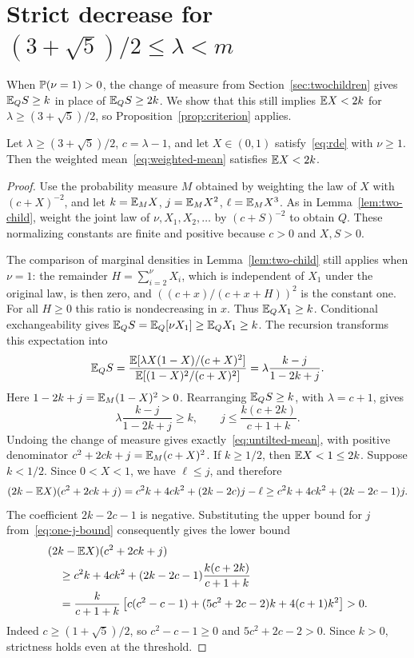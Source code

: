 \section{Strict decrease for \texorpdfstring{$(3+\sqrt5)/2\le\lambda<m$}{(3+sqrt(5))/2 <= lambda < m}}\label{sec:high}

When $\mathbb P(\nu=1)>0$, the change of measure from Section~\ref{sec:twochildren} gives $\mathbb E_QS\ge k$ in place of $\mathbb E_QS\ge2k$. We show that this still implies $\mathbb E X<2k$ for $\lambda\ge(3+\sqrt5)/2$, so Proposition~\ref{prop:criterion} applies.

\begin{lemma}\label{lem:one-child}
Let $\lambda\ge(3+\sqrt5)/2$, $c=\lambda-1$, and let $X\in(0,1)$ satisfy~\eqref{eq:rde} with $\nu\ge1$. Then the weighted mean~\eqref{eq:weighted-mean} satisfies $\mathbb E X<2k$.
\end{lemma}

\begin{proof}
Use the probability measure $M$ obtained by weighting the law of $X$ with $(c+X)^{-2}$, and let $k=\mathbb E_M X$, $j=\mathbb E_M X^2$, $\ell=\mathbb E_M X^3$. As in Lemma~\ref{lem:two-child}, weight the joint law of $\nu,X_1,X_2,\ldots$ by $(c+S)^{-2}$ to obtain $Q$. These normalizing constants are finite and positive because $c>0$ and $X,S>0$.

The comparison of marginal densities in Lemma~\ref{lem:two-child} still applies when $\nu=1$: the remainder $H=\sum_{i=2}^{\nu}X_i$, which is independent of $X_1$ under the original law, is then zero, and $((c+x)/(c+x+H))^2$ is the constant one. For all $H\ge0$ this ratio is nondecreasing in $x$. Thus $\mathbb E_QX_1\ge k$. Conditional exchangeability gives $\mathbb E_QS=\mathbb E_Q[\nu X_1]\ge\mathbb E_QX_1\ge k$. The recursion transforms this expectation into
\[
 \mathbb E_QS=\frac{\mathbb E[\lambda X(1-X)/(c+X)^2]}
 {\mathbb E[(1-X)^2/(c+X)^2]}
 =\lambda\frac{k-j}{1-2k+j}.
\]
Here $1-2k+j=\mathbb E_M(1-X)^2>0$. Rearranging $\mathbb E_QS\ge k$, with $\lambda=c+1$, gives
\begin{equation}\label{eq:one-j-bound}
 \lambda\frac{k-j}{1-2k+j}\ge k,
 \qquad j\le\frac{k(c+2k)}{c+1+k}.
\end{equation}
Undoing the change of measure gives exactly~\eqref{eq:untilted-mean}, with positive denominator $c^2+2ck+j=\mathbb E_M(c+X)^2$. If $k\ge1/2$, then $\mathbb E X<1\le2k$. Suppose $k<1/2$. Since $0<X<1$, we have $\ell\le j$, and therefore
\[
 (2k-\mathbb E X)(c^2+2ck+j)
 =c^2k+4ck^2+(2k-2c)j-\ell
 \ge c^2k+4ck^2+(2k-2c-1)j.
\]
The coefficient $2k-2c-1$ is negative. Substituting the upper bound for $j$ from~\eqref{eq:one-j-bound} consequently gives the lower bound
\begin{align}\label{eq:one-child-polynomial}
 &(2k-\mathbb E X)(c^2+2ck+j)\notag\\
 &\quad\ge c^2k+4ck^2+(2k-2c-1)\frac{k(c+2k)}{c+1+k}\notag\\
 &\quad=\frac{k}{c+1+k}
 \left[c(c^2-c-1)+(5c^2+2c-2)k+4(c+1)k^2\right]>0.
\end{align}
Indeed $c\ge(1+\sqrt5)/2$, so $c^2-c-1\ge0$ and $5c^2+2c-2>0$. Since $k>0$, strictness holds even at the threshold.
\end{proof}

